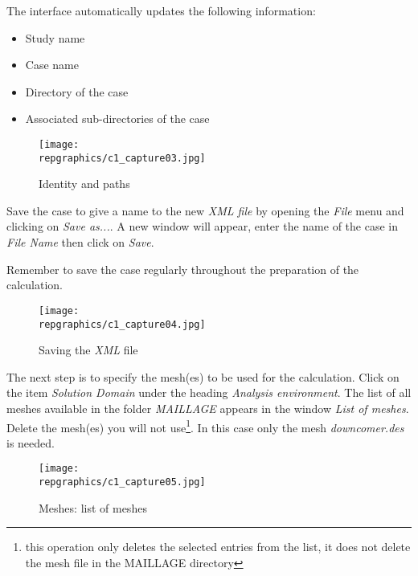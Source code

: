 \clearpage
The interface automatically updates the following information:
\begin{itemize}
        \item Study name
        \item Case name
        \item Directory of the case
        \item Associated sub-directories of the case
\end{itemize}

\begin{figure}[ht]
\begin{center}
\texttt{[image: \\repgraphics/c1\_capture03.jpg]}
\caption{Identity and paths}
\label{fig3_e1}
\end{center}
\end{figure}


\clearpage
Save the case to give a name to the new {\itshape XML file} by opening the
{\itshape File} menu and clicking on {\itshape Save as...}. A new window will
appear, enter the name of the case in {\itshape File Name} then click on
{\itshape Save}.

Remember to save the case regularly throughout the preparation of the calculation.

\begin{figure}[ht]
\begin{center}
\texttt{[image: \\repgraphics/c1\_capture04.jpg]}
\caption{Saving the {\itshape XML} file}
\label{fig4_e1}
\end{center}
\end{figure}


\clearpage
The next step is to specify the mesh(es) to be used for the calculation.
Click on the item {\itshape Solution Domain}
under the heading {\itshape Analysis environment}. The list of all
meshes available in the folder {\itshape MAILLAGE} appears in the
window {\itshape List of meshes}. Delete the mesh(es) you will not
use\footnote{this operation only deletes the selected entries from the list, it
does not delete the mesh file in the MAILLAGE directory}. In this case only the
mesh {\itshape downcomer.des} is needed.

\begin{figure}[ht]
\begin{center}
\texttt{[image: \\repgraphics/c1\_capture05.jpg]}
\caption{Meshes: list of meshes}
\label{fig5_e1}
\end{center}
\end{figure}

